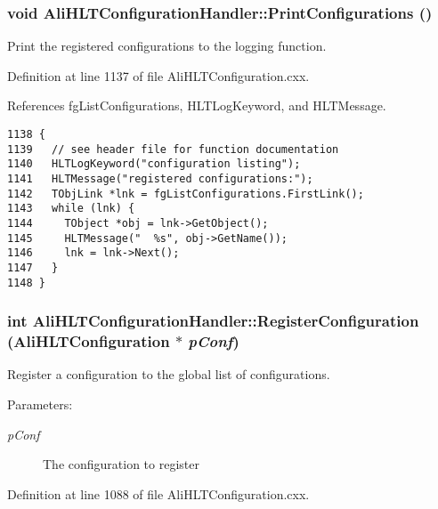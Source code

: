 \subsubsection{\setlength{\rightskip}{0pt plus 5cm}void Ali\-HLTConfiguration\-Handler::Print\-Configurations ()}\label{classAliHLTConfigurationHandler_a7}


Print the registered configurations to the logging function. 

Definition at line 1137 of file Ali\-HLTConfiguration.cxx.

References fg\-List\-Configurations, HLTLog\-Keyword, and HLTMessage.

\footnotesize\begin{verbatim}1138 {
1139   // see header file for function documentation
1140   HLTLogKeyword("configuration listing");
1141   HLTMessage("registered configurations:");
1142   TObjLink *lnk = fgListConfigurations.FirstLink();
1143   while (lnk) {
1144     TObject *obj = lnk->GetObject();
1145     HLTMessage("  %s", obj->GetName());
1146     lnk = lnk->Next();
1147   }
1148 }
\end{verbatim}\normalsize 


\subsubsection{\setlength{\rightskip}{0pt plus 5cm}int Ali\-HLTConfiguration\-Handler::Register\-Configuration ({\bf Ali\-HLTConfiguration} $\ast$ {\em p\-Conf})}\label{classAliHLTConfigurationHandler_a2}


Register a configuration to the global list of configurations. \begin{Desc}
\item[Parameters:]
\begin{description}
\item[{\em p\-Conf}]The configuration to register \end{description}
\end{Desc}


Definition at line 1088 of file Ali\-HLTConfiguration.cxx.

